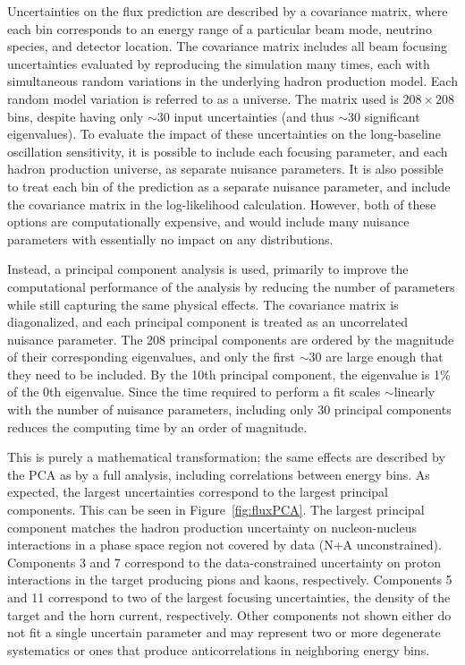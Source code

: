 Uncertainties on the flux prediction are described by a covariance matrix, where each bin corresponds to an energy range of a particular beam mode, neutrino species, and detector location. The covariance matrix includes all beam focusing uncertainties evaluated by reproducing the simulation many times, each with simultaneous random variations in the underlying hadron production model. Each random model variation is referred to as a universe. The  matrix used is $208 \times 208$ bins, despite having only $\sim$30 input uncertainties (and thus $\sim$30 significant eigenvalues). To evaluate the impact of these uncertainties on the long-baseline oscillation sensitivity, it is possible to include each focusing parameter, and each hadron production universe, as separate nuisance parameters. It is also possible to treat each bin of the prediction as a separate nuisance parameter, and include the covariance matrix in the log-likelihood calculation. However, both of these options are computationally expensive, and would include many nuisance parameters with essentially no impact on any distributions.

Instead, a principal component analysis is used, primarily to improve the computational performance of the analysis by reducing the number of parameters while still capturing the same physical effects. The covariance matrix is diagonalized, and each principal component is treated as an uncorrelated nuisance parameter. The 208 principal components are ordered by the magnitude of their corresponding eigenvalues, and only the first $\sim$30 are large enough that they need to be included. By the 10th principal component, the eigenvalue is 1\% of the 0th eigenvalue. Since the time required to perform a fit scales $\sim$linearly with the number of nuisance parameters, including only 30 principal components reduces the computing time by an order of magnitude.

This is purely a mathematical transformation; the same effects are described by the PCA as by a full analysis, including correlations between energy bins. As expected, the largest uncertainties correspond to the largest principal components. This can be seen in Figure~\ref{fig:fluxPCA}. The largest principal component matches the hadron production uncertainty on nucleon-nucleus interactions in a phase space region not covered by data (N+A unconstrained). Components 3 and 7 correspond to the data-constrained uncertainty on proton interactions in the target producing pions and kaons, respectively. Components 5 and 11 correspond to two of the largest focusing uncertainties, the density of the target and the horn current, respectively. Other components not shown either do not fit a single uncertain parameter and may represent two or more degenerate systematics or ones that produce anticorrelations in neighboring energy bins.

